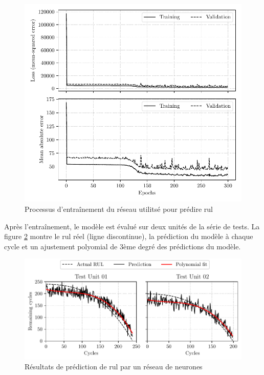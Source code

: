 \begin{figure}[H]
    \centering
    \includegraphics{figures/cmapss_regression_training.pdf}
    \caption{Processus d'entraînement du réseau utilitsé pour prédire \acrshort{rul}}
    \label{fig:cmapss-regression-training}
\end{figure}

Après l'entraînement, le modèle est évalué sur deux unités de la série de tests. La figure \ref{fig:cmapss-regression-prediction} montre le \acrshort{rul} réel (ligne discontinue), la prédiction du modèle à chaque cycle et un ajustement polyomial de 3ème degré des prédictions du modèle.

\begin{figure}[H]
    \centering
    \includegraphics{figures/cmapss_regression_predictions.pdf}
    \caption{Résultats de prédiction de \acrshort{rul} par un réseau de neurones}
    \label{fig:cmapss-regression-prediction}
\end{figure}

